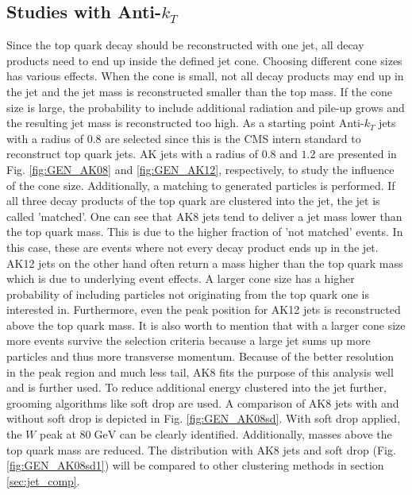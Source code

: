 \FloatBarrier %
\subsection{Studies with Anti-$k_T$}
\label{sec:AK}	
	Since the top quark decay should be reconstructed with one jet, all decay products need to end up inside the defined jet cone. Choosing different cone sizes has various effects. When the cone is small, not all decay products may end up in the jet and the jet mass is reconstructed smaller than the top mass. If the cone size is large, the probability to include additional radiation and pile-up grows and the resulting jet mass is reconstructed too high.	As a starting point Anti-$k_T$ jets with a radius of $0.8$ are selected since this is the CMS intern standard to reconstruct top quark jets.  AK jets with a radius of $0.8$ and $1.2$ are presented in Fig. \ref{fig:GEN_AK08} and \ref{fig:GEN_AK12}, respectively, to study the influence of the cone size. Additionally, a matching to generated particles is performed. If all three decay products of the top quark are clustered into the jet, the jet is called 'matched'. One can see that AK8 jets tend to deliver a jet mass lower than the top quark mass. This is due to the higher fraction of 'not matched' events. In this case, these are events where not every decay product ends up in the jet. AK12 jets on the other hand often return a mass higher than the top quark mass which is due to underlying event effects. A larger cone size has a higher probability of including particles not originating from the top quark one is interested in. Furthermore, even the peak position for AK12 jets is reconstructed above the top quark mass. It is also worth to mention that with a larger cone size more events survive the selection criteria because a large jet sums up more particles and thus more transverse momentum. Because of the better resolution in the peak region and much less tail, AK8 fits the purpose of this analysis well and is further used. To reduce additional energy clustered into the jet further, grooming algorithms like soft drop are used. A comparison of AK8 jets with and without soft drop is depicted in Fig. \ref{fig:GEN_AK08sd}. With soft drop applied, the $W$ peak at $80\;\text{GeV}$ can be clearly identified. Additionally, masses above the top quark mass are reduced. The distribution with AK8 jets and soft drop (Fig. \ref{fig:GEN_AK08sd1}) will be compared to other clustering methods in section \ref{sec:jet_comp}.

